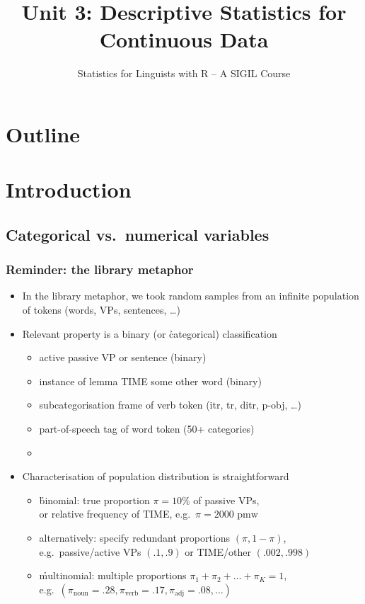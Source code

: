 \documentclass[t]{beamer} %
\title[3a.\ Continuous Data: Description]{Unit 3: Descriptive Statistics for Continuous Data}
\subtitle{Statistics for Linguists with R -- A SIGIL Course}
\date[sigil.r-forge.r-project.org]{%
  \light{\tiny \sigilcopyright}}
\begin{document}
\frame{\titlepage}


\section*{Outline}

\section{Introduction}

\subsection{Categorical vs.\ numerical variables}

\begin{frame}
  \frametitle{Reminder: the library metaphor}

  \begin{itemize}
  \item In the library metaphor, we took random samples from an infinite
    population of tokens (words, VPs, sentences, \ldots)
  \item Relevant property is a binary (or \h{categorical}) classification
    \begin{itemize}
    \item active \vs passive VP or sentence (binary)
    \item instance of lemma TIME \vs some other word (binary)
    \item subcategorisation frame of verb token (itr, tr, ditr, p-obj, \ldots)
    \item part-of-speech tag of word token (50+ categories)
    \item[]
    \end{itemize}
    \pause
  \item Characterisation of population distribution is straightforward
    \begin{itemize}
    \item \h{binomial}: true proportion $\pi = 10\%$ of passive VPs,\\
      or relative frequency of TIME, e.g.\ $\pi = 2000\text{ pmw}$
    \item alternatively: specify redundant proportions $(\pi, 1-\pi)$,\\
      e.g.\ passive/active VPs $(.1, .9)$ or TIME/other $(.002, .998)$
    \item \h{multinomial}: multiple proportions $\pi_1 + \pi_2 + \dots + \pi_K
      = 1$,\\
      e.g.\ $(\pi_{\text{noun}} = .28, \pi_{\text{verb}} = .17, \pi_{\text{adj}} = .08, \ldots)$
    \end{itemize}
  \end{itemize}
\end{frame}
\end{document}
